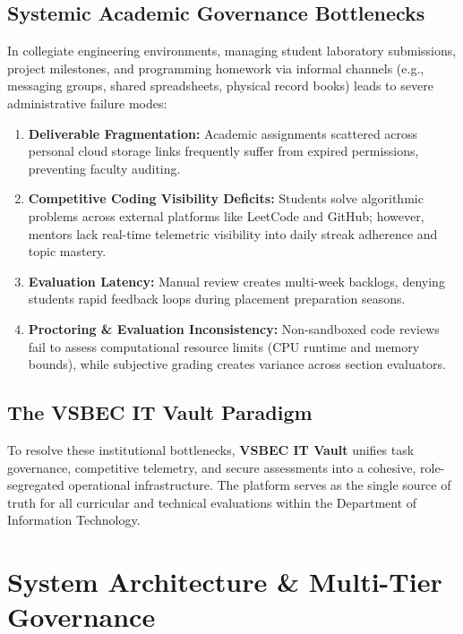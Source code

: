 \documentclass[12pt,a4paper]{report}
\begin{document}
\section{Systemic Academic Governance Bottlenecks}
In collegiate engineering environments, managing student laboratory submissions, project milestones, and programming homework via informal channels (e.g., messaging groups, shared spreadsheets, physical record books) leads to severe administrative failure modes:
\begin{enumerate}[nosep]
    \item \textbf{Deliverable Fragmentation:} Academic assignments scattered across personal cloud storage links frequently suffer from expired permissions, preventing faculty auditing.
    \item \textbf{Competitive Coding Visibility Deficits:} Students solve algorithmic problems across external platforms like LeetCode and GitHub; however, mentors lack real-time telemetric visibility into daily streak adherence and topic mastery.
    \item \textbf{Evaluation Latency:} Manual review creates multi-week backlogs, denying students rapid feedback loops during placement preparation seasons.
    \item \textbf{Proctoring \& Evaluation Inconsistency:} Non-sandboxed code reviews fail to assess computational resource limits (CPU runtime and memory bounds), while subjective grading creates variance across section evaluators.
\end{enumerate}

\section{The VSBEC IT Vault Paradigm}
To resolve these institutional bottlenecks, \textbf{VSBEC IT Vault} unifies task governance, competitive telemetry, and secure assessments into a cohesive, role-segregated operational infrastructure. The platform serves as the single source of truth for all curricular and technical evaluations within the Department of Information Technology.

\chapter{System Architecture \& Multi-Tier Governance}
\end{document}
